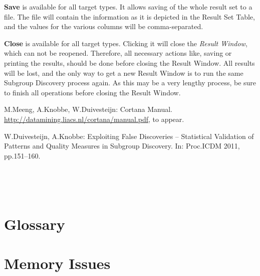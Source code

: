 \documentclass{article}
\begin{document}
\textbf{Save} is available for all target types.  It allows saving of the
whole result set to a file.  The file will contain the information as it is
depicted in the Result Set Table, and the values for the various columns
will be comma-separated.

\textbf{Close} is available for all target types. Clicking it will close the
\emph{Result Window}, which can not be reopened.  Therefore, all necessary
actions like, saving or printing the results, should be done before closing
the Result Window.  All results will be lost, and the only way to get a new
Result Window is to run the same Subgroup Discovery process again.  As this
may be a very lengthy process, be sure to finish all operations before
closing the Result Window.


\begin{thebibliography}{9}

M.\@ Meeng, A.\@ Knobbe, W.\@ Duivesteijn: Cortana Manual.
\url{http://datamining.liacs.nl/cortana/manual.pdf}, to appear.

W.\@ Duivesteijn, A.\@ Knobbe: Exploiting False Discoveries -- Statistical
Validation of Patterns and Quality Measures in Subgroup Discovery. In:
Proc.\@ ICDM 2011, pp.\@ 151--160.

\end{thebibliography}

\appendix
\clearpage
~\vfill


\vfill~
\clearpage

\section{Glossary}
\vspace{-10mm}
\renewcommand*{\glossaryname}{}
\printglossaries


\section{Memory Issues}
\label{sec:memory}
\end{document}
